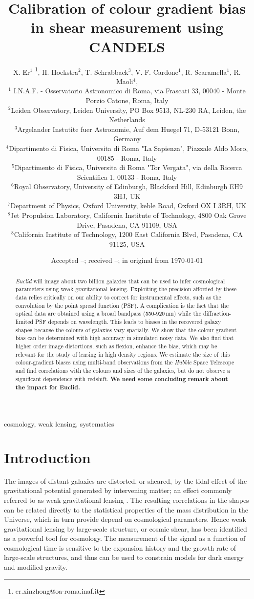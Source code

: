 \documentclass[useAMS,usenatbib]{mnras}
\title[Colour gradient bias]
{Calibration of colour gradient bias in shear measurement using CANDELS}
\author[Xer et al.]%
{
X. Er$^1$ \thanks{er.xinzhong@oa-roma.inaf.it},
H. Hoekstra$^2$, T. Schrabback$^3$, V. F. Cardone$^1$, R. Scaramella$^1$, R. Maoli$^4$,
\newauthor{M. Vicinanza$^{1,4,5}$, B. Gillis$^{6}$ L. Miller$^{7}$, J. Rhodes$^{8,9}$}
\\
$^1$ I.N.A.F. - Osservatorio Astronomico di Roma, via Frascati 33, 00040 - Monte Porzio Catone, Roma, Italy\\
$^2$Leiden Observatory, Leiden University, PO Box 9513, NL-230 RA, Leiden, the Netherlands \\
$^3$Argelander Instutite fuer Astronomie, Auf dem Huegel 71, D-53121 Bonn, Germany\\
$^4$Dipartimento di Fisica, Universita di Roma "La Sapienza", Piazzale Aldo Moro, 00185 - Roma, Italy\\
$^5$Dipartimento di Fisica, Universita di Roma "Tor Vergata", via della Ricerca Scientifica 1, 00133 - Roma, Italy\\
$^6$Royal Observatory, University of Edinburgh, Blackford Hill, Edinburgh EH9 3HJ, UK\\
$^7$Department of Physics, Oxford University, keble Road, Oxford OX I 3RH, UK\\
$^8$Jet Propulsion Laboratory, California Institute of Technology, 4800 Oak Grove Drive, Pasadena, CA 91109, USA\\
$^8$California Institute of Technology, 1200 East California Blvd, Pasadena, CA 91125, USA
}
\date{Accepted --;  received --;  in original from \today}
\begin{document}
\maketitle

\begin{abstract}
{\it Euclid} will image about two billion galaxies that can be used to infer cosmological
parameters using weak gravitational lensing. Exploiting the precision afforded by these
data relies critically on our ability to correct for instrumental effects, such as the convolution
by the point spread function (PSF). A complication is the fact  that the optical data
are obtained using a broad bandpass (550-920\,nm) while the diffraction-limited PSF depends
on wavelength. This leads to biases in the recovered galaxy shapes because the colours of 
galaxies vary spatially.  We show that the colour-gradient bias can be determined with high accuracy in simulated
noisy data. We also find that higher order image distortions, such as flexion, enhance
the bias, which may be relevant for the study of lensing in high density regions.
We estimate the size of this colour-gradient biases using multi-band observations 
from the {\it Hubble} Space Telescope and find correlations with the colours and sizes of
the galaxies, but do not observe a significant dependence with redshift. 
{\bf We need some concluding remark about the impact for Euclid.}

\end{abstract}
\begin{keywords} cosmology, weak lensing, systematics
\end{keywords}


\section{Introduction}

The images of distant galaxies are distorted, or sheared, by the tidal effect of the gravitational  potential generated by intervening matter; an effect commonly referred to as weak gravitational lensing \citep[see e.g.][for a detailed introduction]{Bartelmann01}. The resulting correlations in the shapes can be related directly to the statistical properties of the mass distribution in the Universe, which in turn provide depend on cosmological parameters. Hence weak gravitational lensing by large-scale structure, or cosmic shear, has been identified as a powerful tool for cosmology. The measurement of the signal as a function of cosmological time is sensitive to the expansion history and the growth rate of large-scale structures, and thus can be used to constrain models for dark energy and modified gravity.
\end{document}
